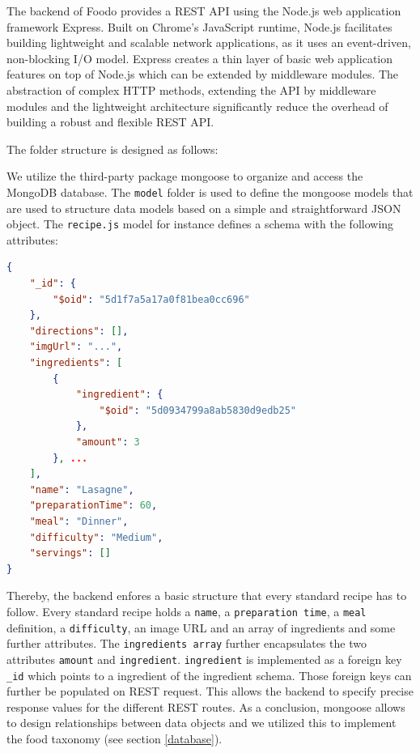 The backend of Foodo provides a REST API using the Node.js web application framework Express. Built on Chrome's JavaScript runtime, Node.js facilitates building lightweight and scalable network applications, as it uses an event-driven, non-blocking I/O model. Express creates a thin layer of basic web application features on top of Node.js which can be extended by middleware modules. The abstraction of complex HTTP methods, extending the API by middleware modules and the lightweight architecture significantly reduce the overhead of building a robust and flexible REST API.


The folder structure is designed as follows:
\vspace{1em}

We utilize the third-party package mongoose to organize and access the MongoDB database. The \texttt{model} folder is used to define the mongoose models that are used to structure data models based on a simple and straightforward JSON object. The \texttt{recipe.js} model for instance defines a schema with the following attributes:

\begin{lstlisting}[language=json,firstnumber=1,caption={Example of recipe "Lasagne"},captionpos=b]
{
	"_id": {
		"$oid": "5d1f7a5a17a0f81bea0cc696"
	},
	"directions": [],
	"imgUrl": "...",
	"ingredients": [
		{
			"ingredient": {
				"$oid": "5d0934799a8ab5830d9edb25"
			},
			"amount": 3
		}, ...
	],
	"name": "Lasagne",
	"preparationTime": 60,
	"meal": "Dinner",
	"difficulty": "Medium",
	"servings": []
}
\end{lstlisting}

Thereby, the backend enfores a basic structure that every standard recipe has to follow. Every standard recipe holds a \texttt{name}, a \texttt{preparation time}, a \texttt{meal} definition, a \texttt{difficulty}, an image URL and an array of ingredients and some further attributes. The \texttt{ingredients array} further encapsulates the two attributes \texttt{amount} and \texttt{ingredient}. \texttt{ingredient} is implemented as a foreign key \texttt{\_id} which points to a ingredient of the ingredient schema. Those foreign keys can further be populated on REST request. This allows the backend to specify precise response values for the different REST routes.  As a conclusion, mongoose allows to design relationships between data objects and we utilized this to implement the food taxonomy (see section \ref{database}).


